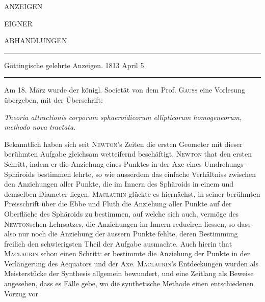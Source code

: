 \clearpage
\thispagestyle{empty}
\begin{center}
\vspace*{2in}
{\Large ANZEIGEN\par}
\vspace{0.5in}
EIGNER\par
\vspace{0.5in}
{\Large ABHANDLUNGEN.\par}
\end{center}
\clearpage
{}
\begin{center}
\rule{0.85\textwidth}{0.3pt}\par
Göttingische gelehrte Anzeigen. 1813 April 5.\par
\rule{0.85\textwidth}{0.3pt}
\end{center}
\medskip
Am 18. März wurde der königl. Societät von dem Prof. \textsc{Gauss} eine Vorlesung übergeben, mit der Überschrift:
\begin{center}
\textit{Theoria attractionis corporum sphaeroidicorum ellipticorum homogeneorum, methodo nova tractata.}
\end{center}
Bekanntlich haben sich seit \textsc{Newton}'s Zeiten die ersten Geometer mit dieser berühmten Aufgabe gleichsam wetteifernd beschäftigt. \textsc{Newton} that den ersten Schritt, indem er die Anziehung eines Punktes in der Axe eines Umdrehungs-Sphäroids bestimmen lehrte, so wie ausserdem das einfache Verhältniss zwischen den Anziehungen aller Punkte, die im Innern des Sphäroids in einem und demselben Diameter liegen. \textsc{Maclaurin} glückte es hiernächst, in seiner berühmten Preisschrift über die Ebbe und Fluth die Anziehung aller Punkte auf der Oberfläche des Sphäroids zu bestimmen, auf welche sich auch, vermöge des \textsc{Newton}schen Lehrsatzes, die Anziehungen im Innern reduciren liessen, so dass also nur noch die Anziehung der äussern Punkte fehlte, deren Bestimmung freilich den schwierigsten Theil der Aufgabe ausmachte. Auch hierin that \textsc{Maclaurin} schon einen Schritt: er bestimmte die Anziehung der Punkte in der Verlängerung des Aequators und der Axe. \textsc{Maclaurin}'s Entdeckungen wurden als Meisterstücke der Synthesis allgemein bewundert, und eine Zeitlang als Beweise angesehen, dass es Fälle gebe, wo die synthetische Methode einen entschiedenen Vorzug vor
